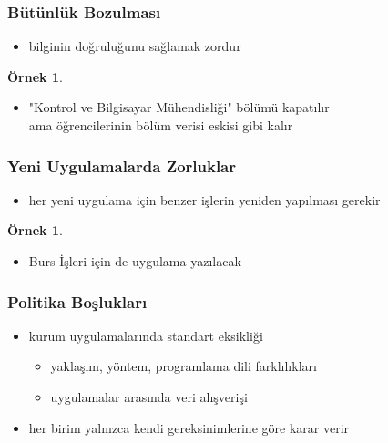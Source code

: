 \documentclass[dvipsnames]{beamer}
\theoremstyle{definition}
\theoremstyle{example}
\newtheorem{ornek}[theorem]{Örnek}
\theoremstyle{plain}
\begin{document}
\begin{frame}
  \frametitle{Bütünlük Bozulması}

  \begin{itemize}
    \item bilginin doğruluğunu sağlamak zordur
  \end{itemize}

  \pause
  \begin{ornek}
    \begin{itemize}
      \item "Kontrol ve Bilgisayar Mühendisliği" bölümü kapatılır\\
	ama öğrencilerinin bölüm verisi eskisi gibi kalır
    \end{itemize}
  \end{ornek}
\end{frame}

\begin{frame}
  \frametitle{Yeni Uygulamalarda Zorluklar}

  \begin{itemize}
    \item her yeni uygulama için benzer işlerin yeniden yapılması gerekir
  \end{itemize}

  \pause
  \begin{ornek}
    \begin{itemize}
      \item Burs İşleri için de uygulama yazılacak
    \end{itemize}
  \end{ornek}
\end{frame}

\begin{frame}
  \frametitle{Politika Boşlukları}

  \begin{itemize}
    \item kurum uygulamalarında standart eksikliği
    \begin{itemize}
      \item yaklaşım, yöntem, programlama dili farklılıkları
      \item uygulamalar arasında veri alışverişi
    \end{itemize}

    \pause
    \item her birim yalnızca kendi gereksinimlerine göre karar verir
  \end{itemize}
\end{frame}
\end{document}
